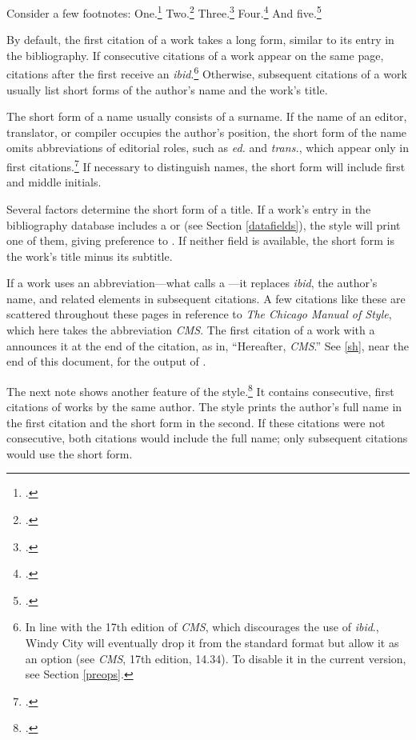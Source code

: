 \documentclass[11pt,letterpaper,oneside]{article}
\begin{document}
Consider a few footnotes: One.\footcite{beattie1974}
Two.\footcite[51]{beattie1974} Three.\footcite[51]{beattie1974}
Four.\footcite[35]{shields2008} And five.\footcite[51]{beattie1974}

By default, the first citation of a work takes a long form, similar to
its entry in the bibliography. If consecutive citations of a work
appear on the same page, citations after the first receive an
\textit{ibid}.\footnote{In line with the 17th edition of \textit{CMS},
which discourages the use of \textit{ibid}., Windy City will
eventually drop it from the standard format but allow it as an option
(see \textit{CMS}, 17th edition, 14.34).\nocite{chicago2017} To
disable it in the current version, see Section \ref{preops}.}
Otherwise, subsequent citations of a work usually list short forms of
the author's name and the work's title.

The short form of a name usually consists of a surname. If the name of
an editor, translator, or compiler occupies the author's position, the
short form of the name omits abbreviations of editorial roles, such as
\textit{ed.} and \textit{trans.}, which appear only in first
citations.\footcite[See 14.18, 14.27, 14.76]{chicago2010} If necessary
to distinguish names, the short form will include first and middle
initials.

Several factors determine the short form of a title. If a work's entry
in the bibliography database includes a  or
 (see Section \ref{datafields}), the style
will print one of them, giving preference to . If
neither field is available, the short form is the work's title minus
its subtitle.

If a work uses an abbreviation---what \biblatex calls a
---it replaces \textit{ibid}, the author's name,
and related elements in subsequent citations. A few citations like
these are scattered throughout these pages in reference to \textit{The
Chicago Manual of Style}, which here takes the abbreviation
\textit{CMS}. The first citation of a work with a 
announces it at the end of the citation, as in, ``Hereafter,
\textit{CMS}.'' See \ref{sh}, near the end of this document, for the
output of .

The next note shows another feature of the
style.\footcite{camus1991a,camus1991b} It contains consecutive, first
citations of works by the same author. The style prints the author's
full name in the first citation and the short form in the second. If
these citations were not consecutive, both citations would include the
full name; only subsequent citations would use the short form.
\end{document}
